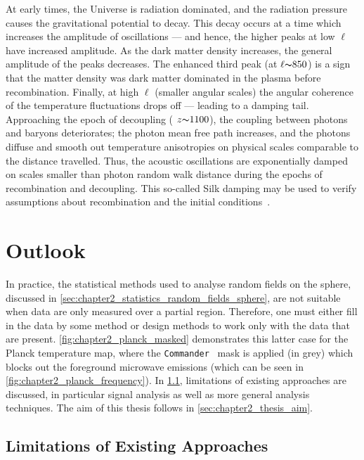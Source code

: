 At early times, the Universe is radiation dominated, and the radiation pressure causes the gravitational potential to decay.
This decay occurs at a time which increases the amplitude of oscillations --- and hence, the higher peaks at low \(\ell{}\) have increased amplitude.
As the dark matter density increases, the general amplitude of the peaks decreases.
The enhanced third peak (at \(\ell{} {\thicksim}\num{850}\)) is a sign that the matter density was dark matter dominated in the plasma before recombination.
Finally, at high \(\ell{}\) (smaller angular scales) the angular coherence of the temperature fluctuations drops off --- leading to a damping tail.
Approaching the epoch of decoupling (\ie{} \(z {\thicksim}\num{1100}\)), the coupling between photons and baryons deteriorates; the photon mean free path increases, and the photons diffuse and smooth out temperature anisotropies on physical scales comparable to the distance travelled.
Thus, the acoustic oscillations are exponentially damped on scales smaller than photon random walk distance during the epochs of recombination and decoupling.
This so-called Silk damping may be used to verify assumptions about recombination and the initial conditions~\cite{Silk1968,Hu2001}.

\section{Outlook}\label{sec:chapter2_outlook}

In practice, the statistical methods used to analyse random fields on the sphere, discussed in \cref{sec:chapter2_statistics_random_fields_sphere}, are not suitable when data are only measured over a partial region.
Therefore, one must either fill in the data by some method or design methods to work only with the data that are present.
\cref{fig:chapter2_planck_masked} demonstrates this latter case for the Planck temperature map, where the \texttt{Commander}~\cite{Eriksen2004,Eriksen2008,Planck2016,Planck2020a} mask is applied (in grey) which blocks out the foreground microwave emissions (which can be seen in \cref{fig:chapter2_planck_frequency}).
In \cref{sec:chapter2_limitations_existing_approaches}, limitations of existing approaches are discussed, in particular signal analysis as well as more general analysis techniques.
The aim of this thesis follows in \cref{sec:chapter2_thesis_aim}.



\subsection{Limitations of Existing Approaches}\label{sec:chapter2_limitations_existing_approaches}

